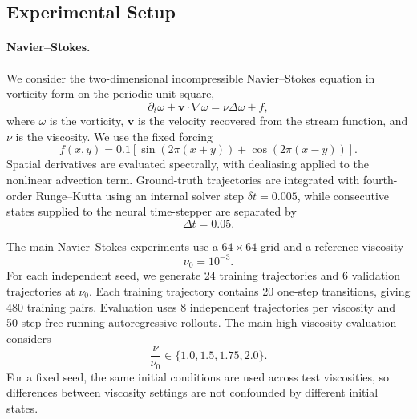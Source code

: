 \documentclass[10pt,twocolumn]{article}
\begin{document}
\subsection{Experimental Setup}
\label{sec:experimental_setup}

\paragraph{Navier--Stokes.}
We consider the two-dimensional incompressible Navier--Stokes equation in
vorticity form on the periodic unit square,
\begin{equation}
    \partial_t \omega
    +
    \mathbf{v}\cdot\nabla\omega
    =
    \nu \Delta\omega + f,
    \label{eq:ns_exp}
\end{equation}
where $\omega$ is the vorticity, $\mathbf{v}$ is the velocity recovered from
the stream function, and $\nu$ is the viscosity. We use the fixed forcing
\begin{equation}
    f(x,y)
    =
    0.1\left[
    \sin\!\left(2\pi(x+y)\right)
    +
    \cos\!\left(2\pi(x-y)\right)
    \right].
    \label{eq:ns_forcing}
\end{equation}
Spatial derivatives are evaluated spectrally, with dealiasing applied to the
nonlinear advection term. Ground-truth trajectories are integrated with
fourth-order Runge--Kutta using an internal solver step
$\delta t=0.005$, while consecutive states supplied to the neural
time-stepper are separated by
\begin{equation}
    \Delta t = 0.05.
\end{equation}

The main Navier--Stokes experiments use a $64\times64$ grid and a reference
viscosity
\begin{equation}
    \nu_0 = 10^{-3}.
\end{equation}
For each independent seed, we generate 24 training trajectories and
6 validation trajectories at $\nu_0$. Each training trajectory contains
20 one-step transitions, giving 480 training pairs. Evaluation uses
8 independent trajectories per viscosity and 50-step free-running
autoregressive rollouts. The main high-viscosity evaluation considers
\begin{equation}
    \frac{\nu}{\nu_0}
    \in
    \{1.0,1.5,1.75,2.0\}.
\end{equation}
For a fixed seed, the same initial conditions are used across test
viscosities, so differences between viscosity settings are not confounded by
different initial states.
\end{document}
